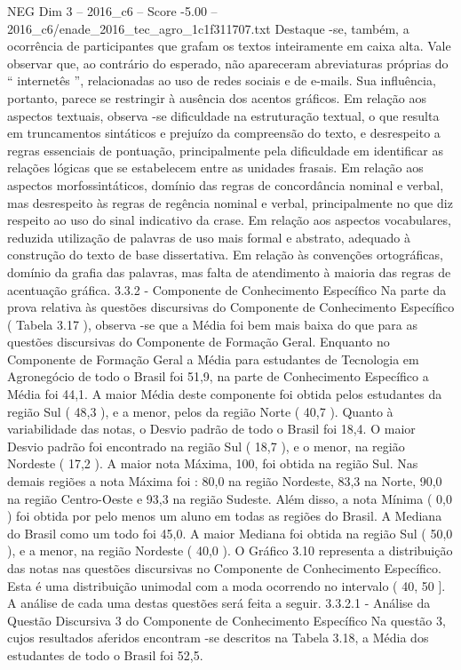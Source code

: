 \begin{textsample}{NEG Dim 3 – 2016\_c6 – Score -5.00 – 2016\_c6/enade\_2016\_tec\_agro\_1c1f311707.txt}
Destaque -se, também, a ocorrência de participantes que grafam os textos inteiramente em caixa alta.
Vale observar que, ao contrário do esperado, não apareceram abreviaturas próprias do “ internetês ”, relacionadas ao uso de redes sociais e de e-mails.
Sua influência, portanto, parece se restringir à ausência dos acentos gráficos.
Em relação aos aspectos textuais, observa -se dificuldade na estruturação textual, o que resulta em truncamentos sintáticos e prejuízo da compreensão do texto, e desrespeito a regras essenciais de pontuação, principalmente pela dificuldade em identificar as relações lógicas que se estabelecem entre as unidades frasais.
Em relação aos aspectos morfossintáticos, domínio das regras de concordância nominal e verbal, mas desrespeito às regras de regência nominal e verbal, principalmente no que diz respeito ao uso do sinal indicativo da crase.
Em relação aos aspectos vocabulares, reduzida utilização de palavras de uso mais formal e abstrato, adequado à construção do texto de base dissertativa.
Em relação às convenções ortográficas, domínio da grafia das palavras, mas falta de atendimento à maioria das regras de acentuação gráfica. 3.3.2 - Componente de Conhecimento Específico Na parte da prova relativa às questões discursivas do Componente de Conhecimento Específico ( Tabela 3.17 ), observa -se que a Média foi bem mais baixa do que para as questões discursivas do Componente de Formação Geral.
Enquanto no Componente de Formação Geral a Média para estudantes de Tecnologia em Agronegócio de todo o Brasil foi 51,9, na parte de Conhecimento Específico a Média foi 44,1.
A maior Média deste componente foi obtida pelos estudantes da região Sul ( 48,3 ), e a menor, pelos da região Norte ( 40,7 ).
Quanto à variabilidade das notas, o Desvio padrão de todo o Brasil foi 18,4.
O maior Desvio padrão foi encontrado na região Sul ( 18,7 ), e o menor, na região Nordeste ( 17,2 ).
A maior nota Máxima, 100, foi obtida na região Sul.
Nas demais regiões a nota Máxima foi : 80,0 na região Nordeste, 83,3 na Norte, 90,0 na região Centro-Oeste e 93,3 na região Sudeste.
Além disso, a nota Mínima ( 0,0 ) foi obtida por pelo menos um aluno em todas as regiões do Brasil.
A Mediana do Brasil como um todo foi 45,0.
A maior Mediana foi obtida na região Sul ( 50,0 ), e a menor, na região Nordeste ( 40,0 ).
O Gráfico 3.10 representa a distribuição das notas nas questões discursivas no Componente de Conhecimento Específico.
Esta é uma distribuição unimodal com a moda ocorrendo no intervalo ( 40, 50 ].
A análise de cada uma destas questões será feita a seguir. 3.3.2.1 - Análise da Questão Discursiva 3 do Componente de Conhecimento Específico Na questão 3, cujos resultados aferidos encontram -se descritos na Tabela 3.18, a Média dos estudantes de todo o Brasil foi 52,5.

\end{textsample}
